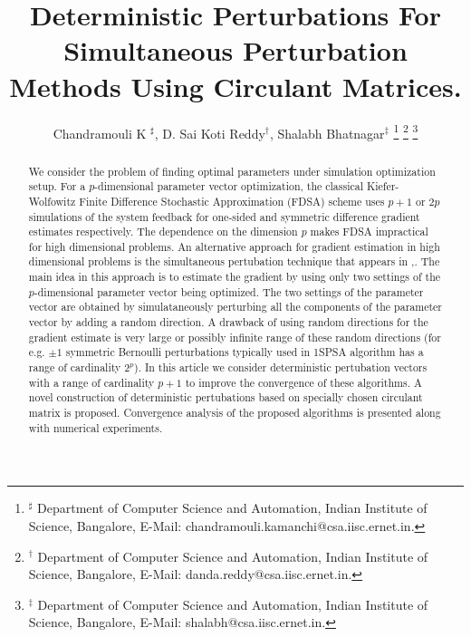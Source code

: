 \documentclass[letterpaper, 10 pt, conference]{ieeeconf}  %
\title{\LARGE \bf
 Deterministic Perturbations For Simultaneous Perturbation Methods Using
 Circulant Matrices.
}
\author{Chandramouli K $^\sharp$, D. Sai Koti Reddy$^\dagger$, Shalabh Bhatnagar$^\ddag$
\thanks{
$^\sharp$ Department of Computer Science and Automation,
Indian Institute of Science, Bangalore,
E-Mail: chandramouli.kamanchi@csa.iisc.ernet.in.}
\thanks{
$^\dagger$ Department of Computer Science and Automation,
Indian Institute of Science, Bangalore,
E-Mail: danda.reddy@csa.iisc.ernet.in.}
\thanks{$^\ddag$ Department of Computer Science and Automation,
Indian Institute of Science, Bangalore,
E-Mail: shalabh@csa.iisc.ernet.in.}
}
\begin{document}
% 
% 
\maketitle
% 
% 
\begin{abstract}
We consider the problem of finding optimal parameters under simulation optimization setup.
For a $p$-dimensional parameter 
vector optimization, the classical Kiefer-Wolfowitz Finite Difference Stochastic 
Approximation (FDSA) scheme uses $p+1$ or $2p$ simulations of the system feedback for one-sided and symmetric difference gradient estimates respectively.
The dependence on the dimension $p$ makes FDSA impractical for high dimensional problems.
An alternative approach for gradient estimation in high dimensional problems is the 
simultaneous pertubation technique that appears in \cite{spall},\cite{kushcla}.
The main idea in this approach is to estimate the gradient by using only two settings of 
the $p$-dimensional parameter vector being optimized. 
The two settings of the parameter vector are obtained by
simulataneously perturbing all the components of the parameter vector by adding a random 
direction. A drawback of using random directions for the gradient estimate is very large
or possibly infinite range of these random directions (for e.g. $\pm 1$ symmetric 
Bernoulli perturbations typically used in 1SPSA algorithm has a range of cardinality $2^p$).
In this article we consider deterministic pertubation vectors with a range of cardinality
$p+1$ to improve the convergence of these algorithms. A novel construction of deterministic pertubations 
based on specially chosen circulant matrix is proposed. Convergence analysis of the proposed
algorithms is presented along with numerical experiments. 
\end{abstract}
\end{document}
